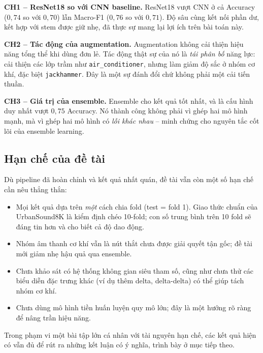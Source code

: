 \textbf{CH1 -- ResNet18 so với CNN baseline.} ResNet18 vượt CNN ở cả Accuracy
($0{,}74$ so với $0{,}70$) lẫn Macro-F1 ($0{,}76$ so với $0{,}71$). Độ sâu cùng
kết nối phần dư, kết hợp với stem được giữ nhẹ, đã thực sự mang lại lợi ích trên
bài toán này.

\textbf{CH2 -- Tác động của augmentation.} Augmentation không cải thiện hiệu năng
tổng thể khi dùng đơn lẻ. Tác động thật sự của nó là \textit{tái phân bố} năng
lực: cải thiện các lớp trầm như \texttt{air\_conditioner}, nhưng làm giảm độ sắc
ở nhóm cơ khí, đặc biệt \texttt{jackhammer}. Đây là một sự đánh đổi chứ không
phải một cải tiến thuần.

\textbf{CH3 -- Giá trị của ensemble.} Ensemble cho kết quả tốt nhất, và là cấu
hình duy nhất vượt $0{,}75$ Accuracy. Nó thành công không phải vì ghép hai mô
hình mạnh, mà vì ghép hai mô hình có \textit{lỗi khác nhau} -- minh chứng cho
nguyên tắc cốt lõi của ensemble learning.

\subsection{Hạn chế của đề tài}

Dù pipeline đã hoàn chỉnh và kết quả nhất quán, đề tài vẫn còn một số hạn chế cần
nêu thẳng thắn:

\begin{itemize}[leftmargin=1.4em,itemsep=1pt]
  \item Mọi kết quả dựa trên \textit{một} cách chia fold (test = fold 1). Giao
        thức chuẩn của UrbanSound8K là kiểm định chéo 10-fold; con số trung bình
        trên 10 fold sẽ đáng tin hơn và cho biết cả độ dao động.
  \item Nhóm âm thanh cơ khí vẫn là nút thắt chưa được giải quyết tận gốc; đề
        tài mới giảm nhẹ hậu quả qua ensemble.
  \item Chưa khảo sát có hệ thống không gian siêu tham số, cũng như chưa thử các
        biểu diễn đặc trưng khác (ví dụ thêm delta, delta-delta) có thể giúp tách
        nhóm cơ khí.
  \item Chưa dùng mô hình tiền huấn luyện quy mô lớn; đây là một hướng rõ ràng để
        nâng trần hiệu năng.
\end{itemize}

Trong phạm vi một bài tập lớn cá nhân với tài nguyên hạn chế, các kết quả hiện có
vẫn đủ để rút ra những kết luận có ý nghĩa, trình bày ở mục tiếp theo.
